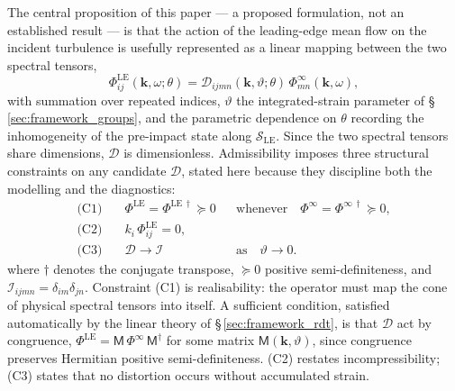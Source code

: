 \documentclass[lineno]{JFM-FLM_Au}
\begin{document}
The central proposition of this paper --- a proposed formulation, not an
established result --- is that the action of the leading-edge mean flow on
the incident turbulence is usefully represented as a linear mapping between
the two spectral tensors,
\begin{equation}
  \Phi^{\mathrm{LE}}_{ij}(\boldsymbol{k},\omega;\theta)
  = \mathcal{D}_{ijmn}(\boldsymbol{k},\vartheta;\theta)\,
    \Phi^{\infty}_{mn}(\boldsymbol{k},\omega),
  \label{eq:operator}
\end{equation}
with summation over repeated indices, $\vartheta$ the integrated-strain
parameter of \S\,\ref{sec:framework_groups}, and the parametric dependence
on $\theta$ recording the inhomogeneity of the pre-impact state along
$\mathcal{S}_{\mathrm{LE}}$. Since the two spectral tensors share
dimensions, $\mathcal{D}$ is dimensionless. Admissibility imposes three
structural constraints on any candidate $\mathcal{D}$, stated here because
they discipline both the modelling and the diagnostics:
\begin{equation}
\begin{aligned}
\text{(C1)}\quad
&\Phi^{\mathrm{LE}}
 = \Phi^{\mathrm{LE}\,\dagger} \succeq 0
 &&\text{whenever}\quad
 \Phi^{\infty}
 = \Phi^{\infty\,\dagger} \succeq 0,
\\[2mm]
\text{(C2)}\quad
&k_i\,\Phi^{\mathrm{LE}}_{ij} = 0,
\\[2mm]
\text{(C3)}\quad
&\mathcal{D} \to \mathcal{I}
 &&\text{as}\quad \vartheta \to 0 .
\end{aligned}
\label{eq:admissibility}
\end{equation}
where $\dagger$ denotes the conjugate transpose, $\succeq 0$ positive
semi-definiteness, and
$\mathcal{I}_{ijmn} = \delta_{im}\delta_{jn}$. Constraint (C1) is
realisability: the operator must map the cone of physical spectral tensors
into itself. A sufficient condition, satisfied automatically by the linear
theory of \S\,\ref{sec:framework_rdt}, is that $\mathcal{D}$ act by
congruence,
$\Phi^{\mathrm{LE}} = \mathsf{M}\,\Phi^{\infty}\,\mathsf{M}^{\dagger}$ for
some matrix $\mathsf{M}(\boldsymbol{k},\vartheta)$, since congruence
preserves Hermitian positive semi-definiteness. (C2) restates
incompressibility; (C3) states that no distortion occurs without
accumulated strain.
\end{document}
